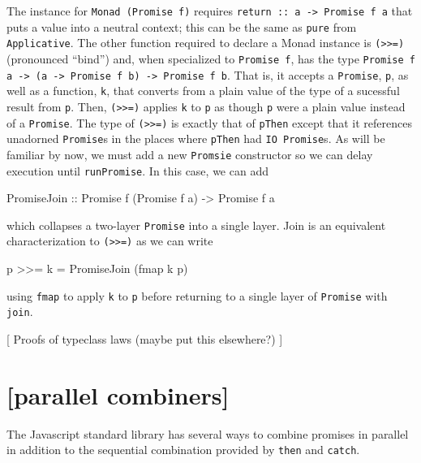 \documentclass[12pt, english, letterpaper]{kuthesis}
\newcommand{\lit}[1]{\texttt{#1}}
\begin{document}
The instance for \lit{Monad (Promise f)} requires \lit{return :: a -> Promise f a} that puts a value into a neutral context; this can be the same as \lit{pure} from \lit{Applicative}.  The other function required to declare a Monad instance is \lit{(>>=)} (pronounced ``bind'') and, when specialized to \lit{Promise f}, has the type \lit{Promise f a -> (a -> Promise f b) -> Promise f b}.  That is, it accepts a \lit{Promise}, \lit p, as well as a function, \lit k, that converts from a plain value of the type of a sucessful result from \lit p.  Then, \lit{(>>=)} applies \lit k to \lit p as though \lit p were a plain value instead of a \lit{Promise}.  The type of \lit{(>>=)} is exactly that of \lit{pThen} except that it references unadorned \lit{Promise}s in the places where \lit{pThen} had \lit{IO Promise}s.  As will be familiar by now, we must add a new \lit{Promsie} constructor so we can delay execution until \lit{runPromise}.  In this case, we can add
  \begin{code}
    PromiseJoin :: Promise f (Promise f a) -> Promise f a
  \end{code}
  which collapses a two-layer \lit{Promise} into a single layer.  Join is an equivalent characterization to \lit{(>>=)} as we can write
  \begin{code}
    p >>= k = PromiseJoin (fmap k p)
  \end{code}
  using \lit{fmap} to apply \lit k to \lit p before returning to a single layer of \lit{Promise} with \lit{join}.

[ Proofs of typeclass laws (maybe put this elsewhere?) ]

\section*{[parallel combiners]}
The Javascript standard library has several ways to combine promises in parallel in addition to the sequential combination provided by \lit{then} and \lit{catch}.
\end{document}

